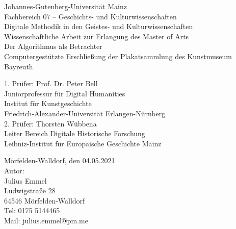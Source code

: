 \documentclass[a4paper,12pt,ngerman]{article}
\begin{document}
	\begin{titlepage}
	\begin{singlespace}
		\begin{center}	
			{\large Johannes-Gutenberg-Universität Mainz}\\
			\vspace{0.5cm}
			{\large Fachbereich 07 -- Geschichts- und Kulturwissenschaften}\\
			\vspace{0.5cm}
			{\large Digitale Methodik in den Geistes- und Kulturwissenschaften}\\
			\vspace{1cm}
			{\large Wissenschaftliche Arbeit zur Erlangung des Master of Arts}\\
			\vspace{2cm}
			{\Huge Der Algorithmus als Betrachter \\ Computergestützte Erschließung der Plakatsammlung des Kunstmuseum Bayreuth}\\
			\vspace{2cm}
		\end{center}
			{\large 1. Prüfer: Prof. Dr. Peter Bell\\\hspace*{24mm}Juniorprofessur für Digital Humanities\\\hspace*{24mm}Institut für Kunstgeschichte\\\hspace*{24mm}Friedrich-Alexander-Universität Erlangen-Nürnberg}\\
			{\large 2. Prüfer: Thorsten Wübbena\\\hspace*{24mm}Leiter Bereich Digitale Historische Forschung\\\hspace*{24mm}Leibniz-Institut für Europäische Geschichte Mainz}\\
			\vspace{2cm}
		\begin{flushright}
			{\large Mörfelden-Walldorf, den 04.05.2021}\\
			\vspace{0.5cm}
			{\large Autor: \\ Julius Emmel \\ Ludwigstraße 28 \\ 64546 Mörfelden-Walldorf}\\
			\vspace{0.5cm}
			{\large Tel: 0175 5144465 \\ Mail: julius.emmel@pm.me}
		\end{flushright}
	\restoregeometry
	\end{singlespace}
	\end{titlepage}
\end{document}
